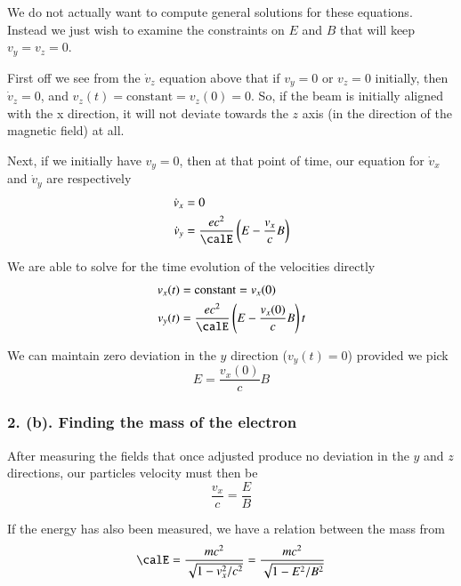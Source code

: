 {We do not actually want to compute general solutions for these equations.  Instead we just wish to examine the constraints on \(E\) and \(B\) that will keep \(v_y = v_z = 0\).

First off we see from the \(\dot{v}_z\) equation above that if \(v_y = 0\) or \(v_z = 0\) initially, then \(\dot{v}_z = 0\), and \(v_z(t) = \text{constant} = v_z(0) = 0\).  So, if the beam is initially aligned with the x direction, it will not deviate towards the \(z\) axis (in the direction of the magnetic field) at all.

Next, if we initially have \(v_y = 0\), then at that point of time, our equation for \(\dot{v}_x\) and \(\dot{v}_y\) are respectively
%
\begin{equation}\label{eqn:relElectroDynProblemSet2:370}
\begin{aligned}
\dot{v}_x &= 0 \\
\dot{v}_y &= \frac{e c^2}{\calE} \left( E - \frac{v_x}{c} B \right)
\end{aligned}
\end{equation}

We are able to solve for the time evolution of the velocities directly
%
\begin{equation}\label{eqn:relElectroDynProblemSet2:390}
\begin{aligned}
v_x(t) &= \text{constant} = v_x(0) \\
v_y(t) &= \frac{e c^2}{\calE} \left( E - \frac{v_x(0)}{c} B \right) t
\end{aligned}
\end{equation}

We can maintain zero deviation in the \(y\) direction (\(v_y(t) = 0\)) provided we pick
%
\begin{equation}\label{eqn:relElectroDynProblemSet2:410}
E = \frac{v_x(0)}{c} B
\end{equation}

\subsubsection{2. (b). Finding the mass of the electron}

After measuring the fields that once adjusted produce no deviation in the \(y\) and \(z\) directions, our particles velocity must then be
%
\begin{equation}\label{eqn:relElectroDynProblemSet2:430}
\frac{v_x}{c} = \frac{E}{B}
\end{equation}

If the energy has also been measured, we have a relation between the mass from
%
\begin{equation}\label{eqn:relElectroDynProblemSet2:450}
\calE = \frac{m c^2}{\sqrt{1 - v_x^2/c^2}} = \frac{ m c^2 }{ \sqrt{ 1 - E^2/B^2 }}
\end{equation}

}
